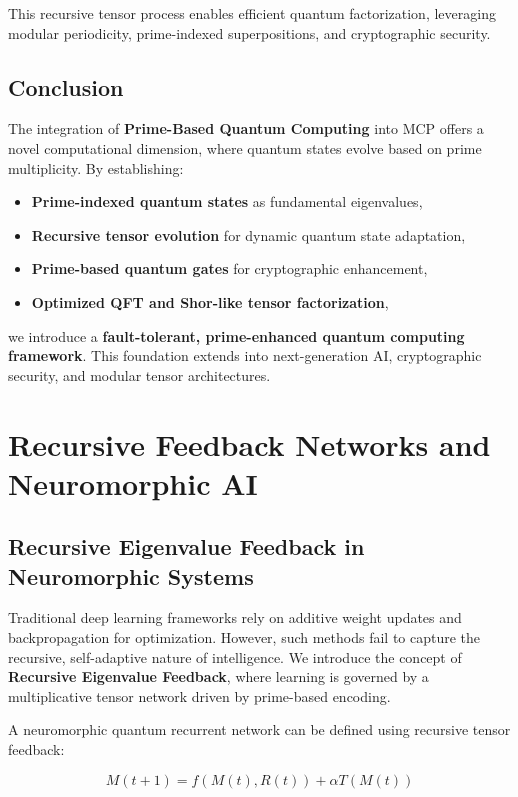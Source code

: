 \documentclass{article}
\theoremstyle{plain}
\theoremstyle{plain}
\theoremstyle{definition}
\theoremstyle{remark}
\begin{document}
This recursive tensor process enables efficient quantum factorization, leveraging modular periodicity, prime-indexed superpositions, and cryptographic security.

\subsection{Conclusion}

The integration of \textbf{Prime-Based Quantum Computing} into MCP offers a novel computational dimension, where quantum states evolve based on prime multiplicity. By establishing:
\begin{itemize}
    \item \textbf{Prime-indexed quantum states} as fundamental eigenvalues,
    \item \textbf{Recursive tensor evolution} for dynamic quantum state adaptation,
    \item \textbf{Prime-based quantum gates} for cryptographic enhancement,
    \item \textbf{Optimized QFT and Shor-like tensor factorization},
\end{itemize}
we introduce a \textbf{fault-tolerant, prime-enhanced quantum computing framework}. This foundation extends into next-generation AI, cryptographic security, and modular tensor architectures.
\section{Recursive Feedback Networks and Neuromorphic AI}

\subsection{Recursive Eigenvalue Feedback in Neuromorphic Systems}

Traditional deep learning frameworks rely on additive weight updates and backpropagation for optimization. However, such methods fail to capture the recursive, self-adaptive nature of intelligence. We introduce the concept of \textbf{Recursive Eigenvalue Feedback}, where learning is governed by a multiplicative tensor network driven by prime-based encoding.

A neuromorphic quantum recurrent network can be defined using recursive tensor feedback:

\begin{equation}
M(t+1) = f(M(t), R(t)) + \alpha T(M(t))
\end{equation}
\end{document}
